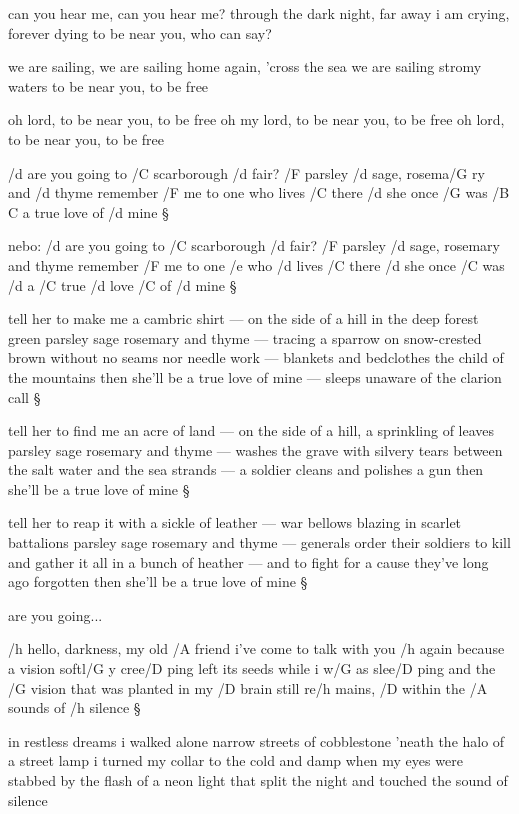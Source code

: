 can you hear me, can you hear me?
through the dark night, far away
i am crying, forever dying
to be near you, who can say? \s

we are sailing, we are sailing
home again, 'cross the sea
we are sailing stromy waters
to be near you, to be free \s

oh lord, to be near you, to be free
oh my lord, to be near you, to be free
oh lord, to be near you, to be free




/d are you going to /C scarborough /d fair? 
/F parsley /d sage, rosema/G ry and /d thyme
remember /F me to one who lives /C there
/d she once /G was /{B C} a true love of /d mine \S

nebo:
/d are you going to /C scarborough /d fair? 
/F parsley /d sage, rosemary and thyme
remember /F me to one /e who /d lives /C there
/d she once /C was /d a /C true /d love /C of /d mine \S

tell her to make me a cambric shirt
--- on the side of a hill in the deep forest green
parsley sage rosemary and thyme
--- tracing a sparrow on snow-crested brown
without no seams nor needle work
--- blankets and bedclothes the child of the mountains
then she'll be a true love of mine
--- sleeps unaware of the clarion call \S

tell her to find me an acre of land
--- on the side of a hill, a sprinkling of leaves
parsley sage rosemary and thyme
--- washes the grave with silvery tears
between the salt water and the sea strands
--- a soldier cleans and polishes a gun
then she'll be a true love of mine \S

tell her to reap it with a sickle of leather
--- war bellows blazing in scarlet battalions
parsley sage rosemary and thyme
--- generals order their soldiers to kill
and gather it all in a bunch of heather
--- and to fight for a cause they've long ago forgotten
then she'll be a true love of mine \S

are you going...



/h hello, darkness, my old /A friend
i've come to talk with you /h again
because a vision softl/G y cree/D ping
left its seeds while i w/G as slee/D ping
and the /G vision that was planted in my /D brain
still re/h mains, /D within the /A sounds of /h silence \S

in restless dreams i walked alone
narrow streets of cobblestone
'neath the halo of a street lamp
i turned my collar to the cold and damp
when my eyes were stabbed by the flash of a neon light
that split the night and touched the sound of silence \s

